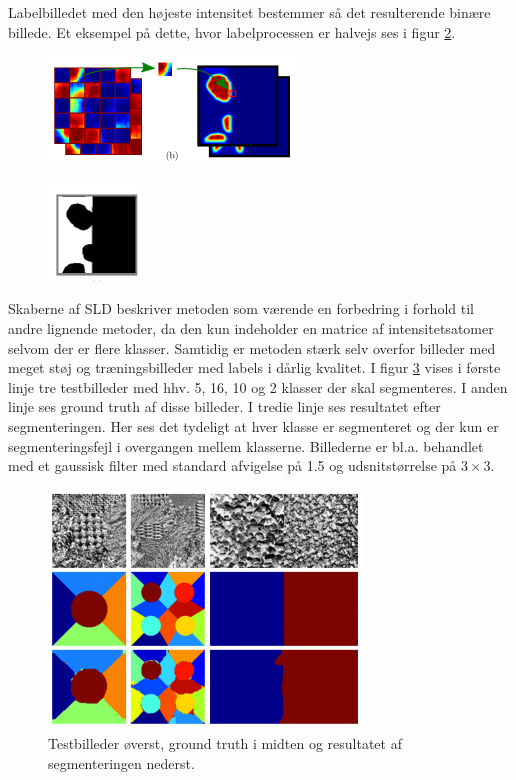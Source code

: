 Labelbilledet med den højeste intensitet bestemmer så det resulterende binære billede. Et eksempel på dette, hvor labelprocessen er halvejs ses i figur \ref{fig:postmethod_sld_resulting}.

\begin{figure}[H]
		\centering
		\includegraphics[scale=1]{files/postmethod/img/dict_4.png}
	\caption{\label{fig:postmethod_sld_labelpatch}}
\end{figure}

\begin{figure}[H]
		\centering
		\includegraphics[scale=1]{files/postmethod/img/dict_5.png}
	\caption{\label{fig:postmethod_sld_resulting}}
\end{figure}

Skaberne af SLD beskriver metoden som værende en forbedring i forhold til andre lignende metoder, da den kun indeholder en matrice af intensitetsatomer selvom der er flere klasser. Samtidig er metoden stærk selv overfor billeder med meget støj og træningsbilleder med labels i dårlig kvalitet. I figur \ref{fig:postmethod_sld_testing} vises i første linje tre testbilleder med hhv. 5, 16, 10 og 2 klasser der skal segmenteres. I anden linje ses ground truth af disse billeder. I tredie linje ses resultatet efter segmenteringen. Her ses det tydeligt at hver klasse er segmenteret og der kun er segmenteringsfejl i overgangen mellem klasserne. Billederne er bl.a. behandlet med et gaussisk filter med standard afvigelse på 1.5 og udsnitstørrelse på $3\times3$.

\begin{figure}[H]
		\centering
		\includegraphics[scale=1]{files/postmethod/img/dict_6.png}
	\caption{Testbilleder øverst, ground truth i midten og resultatet af segmenteringen nederst.\label{fig:postmethod_sld_testing}}
\end{figure}

